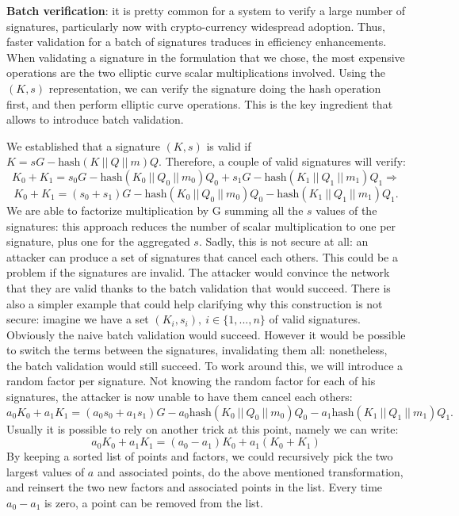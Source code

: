 \bigskip
\noindent
{\bf Batch verification}: it is pretty common for a system to verify a large number of signatures, particularly now with crypto-currency widespread adoption. Thus, faster validation for a batch of signatures traduces in efficiency enhancements.
\\
When validating a signature in the formulation that we chose, the most expensive operations are the two elliptic curve scalar multiplications involved. Using the $(K, s)$ representation, we can verify the signature doing the hash operation first, and then perform elliptic curve operations. This is the key ingredient that allows to introduce batch validation.

\bigskip
\noindent
We established that a signature $(K, s)$ is valid if $K = sG - \text{hash}(K \ || \ Q \ || \ m)Q$. 
Therefore, a couple of valid signatures will verify:
$$K_0 + K_1 = s_0G - \text{hash}(K_0 \ || \ Q_0 \ || \ m_0)Q_0 + s_1G - \text{hash}(K_1 \ || \ Q_1 \ || \ m_1)Q_1 \Longrightarrow
$$
$$K_0 + K_1 = (s_0 + s_1)G - \text{hash}(K_0 \ || \ Q_0 \ || \ m_0)Q_0 - \text{hash}(K_1 \ || \ Q_1 \ || \ m_1)Q_1.$$
We are able to factorize multiplication by G summing all the $s$ values of the signatures: this approach reduces the number of scalar multiplication to one per signature, plus one for the aggregated $s$. Sadly, this is not secure at all: an attacker can produce a set of signatures that cancel each others. This could be a problem if the signatures are invalid. The attacker would convince the network that they are valid thanks to the batch validation that would succeed. There is also a simpler example that could help clarifying why this construction is not secure: imagine we have a set $(K_i, s_i), \ i \in \{1, ..., n\}$ of valid signatures. Obviously the naive batch validation would succeed. However it would be possible to switch the terms between the signatures, invalidating them all: nonetheless, the batch validation would still succeed. To work around this, we will introduce a random factor per signature. Not knowing the random factor for each of his signatures, the attacker is now unable to have them cancel each others:
$$a_0K_0 + a_1K_1 = (a_0s_0 + a_1s_1)G - a_0\text{hash}(K_0 \ || \ Q_0 \ || \ m_0)Q_0 - a_1\text{hash}(K_1 \ || \ Q_1 \ || \ m_1)Q_1.$$
Usually it is possible to rely on another trick at this point, namely we can write:
$$a_0K_0 + a_1K_1 = (a_0 - a_1)K_0 + a_1(K_0 + K_1)$$
By keeping a sorted list of points and factors, we could recursively pick the two largest values of $a$ and associated points, do the above mentioned transformation, and reinsert the two new factors and associated points in the list. Every time $a_0 - a_1$ is zero, a point can be removed from the list.
